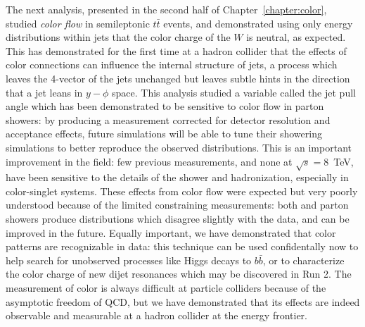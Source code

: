 The next analysis, presented in the second half of Chapter~\ref{chapter:color}, studied \textit{color flow} in semileptonic $t\bar{t}$ events, and demonstrated using only energy distributions within jets that the color charge of the $W$ is neutral, as expected. This has demonstrated for the first time at a hadron collider that the effects of color connections can influence the internal structure of jets, a process which leaves the 4-vector of the jets unchanged but leaves subtle hints in the direction that a jet leans in $y-\phi$ space. This analysis studied a variable called the jet pull angle which has been demonstrated to be sensitive to color flow in parton showers: by producing a measurement corrected for detector resolution and acceptance effects, future simulations will be able to tune their showering simulations to better reproduce the observed distributions. This is an important improvement in the field: few previous measurements, and none at $\sqrt{s} = 8$~TeV, have been sensitive to the details of the shower and hadronization, especially in color-singlet systems. These effects from color flow were expected but very poorly understood because of the limited constraining measurements: both \Pythia and \Herwigpp parton showers produce distributions which disagree slightly with the data, and can be improved in the future. Equally important, we have demonstrated that color patterns are recognizable in data: this technique can be used confidentally now to help search for unobserved processes like Higgs decays to $b\bar{b}$, or to characterize the color charge of new dijet resonances which may be discovered in Run 2. The measurement of color is always difficult at particle colliders because of the asymptotic freedom of QCD, but we have demonstrated that its effects are indeed observable and measurable at a hadron collider at the energy frontier.

